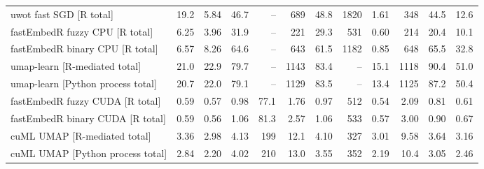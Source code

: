 \begin{table}[p]
{\begin{tabular}{lrrrrrrrrrrr}
uwot fast SGD [R total] & 19.2 & 5.84 & 46.7 & -- & 689 & 48.8 & 1820 & 1.61 & 348 & 44.5 & 12.6 \\
fastEmbedR fuzzy CPU [R total] & 6.25 & 3.96 & 31.9 & -- & 221 & 29.3 & 531 & 0.60 & 214 & 20.4 & 10.1 \\
fastEmbedR binary CPU [R total] & 6.57 & 8.26 & 64.6 & -- & 643 & 61.5 & 1182 & 0.85 & 648 & 65.5 & 32.8 \\
umap-learn [R-mediated total] & 21.0 & 22.9 & 79.7 & -- & 1143 & 83.4 & -- & 15.1 & 1118 & 90.4 & 51.0 \\
umap-learn [Python process total] & 20.7 & 22.0 & 79.1 & -- & 1129 & 83.5 & -- & 13.4 & 1125 & 87.2 & 50.4 \\
fastEmbedR fuzzy CUDA [R total] & 0.59 & 0.57 & 0.98 & 77.1 & 1.76 & 0.97 & 512 & 0.54 & 2.09 & 0.81 & 0.61 \\
fastEmbedR binary CUDA [R total] & 0.59 & 0.56 & 1.06 & 81.3 & 2.57 & 1.06 & 533 & 0.57 & 3.00 & 0.90 & 0.67 \\
cuML UMAP [R-mediated total] & 3.36 & 2.98 & 4.13 & 199 & 12.1 & 4.10 & 327 & 3.01 & 9.58 & 3.64 & 3.16 \\
cuML UMAP [Python process total] & 2.84 & 2.20 & 4.02 & 210 & 13.0 & 3.55 & 352 & 2.19 & 10.4 & 3.05 & 2.46 \\
\bottomrule
\end{tabular}%
}
\end{table}
